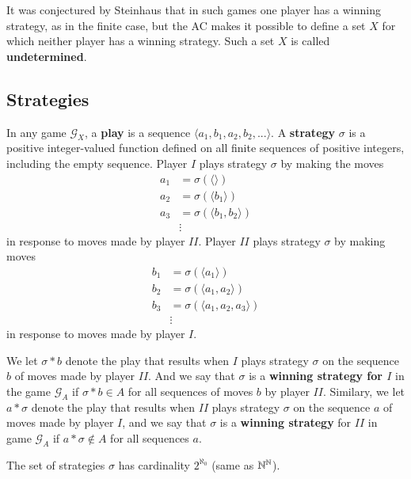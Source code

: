 \documentclass[12pt, a4paper, oneside, openright, titlepage]{book}
\begin{document}
It was conjectured by Steinhaus that in such games one player has a winning strategy, as in the finite case, but the AC makes it possible to define a set $X$ for which neither player has a winning strategy. Such a set $X$ is called \textbf{undetermined}.

\subsection{Strategies}

In any game $\mathcal{G}_X$, a \textbf{play} is a sequence $\langle a_1,b_1,a_2,b_2,...\rangle$. A \textbf{strategy} $\sigma$ is a positive integer-valued function defined on all finite sequences of positive integers, including the empty sequence. Player $I$ plays strategy $\sigma$ by making the moves \begin{align*}
    a_1 &= \sigma(\langle\rangle) \\
    a_2 &= \sigma(\langle b_1\rangle) \\
    a_3 &= \sigma(\langle b_1,b_2\rangle) \\
    &\vdots 
\end{align*}
in response to moves made by player $II$. Player $II$ plays strategy $\sigma$ by making moves \begin{align*}
    b_1 &= \sigma(\langle a_1\rangle) \\
    b_2 &= \sigma(\langle a_1,a_2\rangle) \\
    b_3 &= \sigma(\langle a_1,a_2,a_3\rangle) \\
    &\vdots 
\end{align*}
in response to moves made by player $I$.

We let $\sigma*b$ denote the play that results when $I$ plays strategy $\sigma$ on the sequence $b$ of moves made by player $II$. And we say that $\sigma$ is a \textbf{winning strategy for $I$} in the game $\mathcal{G}_A$ if $\sigma*b \in A$ for all sequences of moves $b$ by player $II$. Similary, we let $a*\sigma$ denote the play that results when $II$ plays strategy $\sigma$ on the sequence $a$ of moves made by player $I$, and we say that $\sigma$ is a \textbf{winning strategy} for $II$ in game $\mathcal{G}_A$ if $a*\sigma \notin A$ for all sequences $a$.

The set of strategies $\sigma$ has cardinality $2^{\aleph_0}$ (same as $\mathbb N^{\mathbb N}$).
\end{document}

